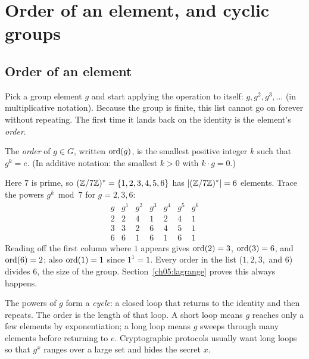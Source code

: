 \section{Order of an element, and cyclic groups}
\label{ch05:order}

\subsection{Order of an element}

Pick a group element $g$ and start applying the operation to itself: $g, g^2, g^3,
\dots$ (in multiplicative notation). Because the group is finite, this list cannot go on
forever without repeating. The first time it lands back on the identity is the element's
\emph{order}.

\begin{definition}
\label{ch05:def-order}
The \emph{order} of $g \in G$, written $\operatorname{ord}(g)$, is the smallest positive integer $k$
such that $g^k = e$. (In additive notation: the smallest $k>0$ with $k\cdot g = 0$.)
\end{definition}

\begin{example}
\label{ch05:ex-orders-7}
Here $7$ is prime, so $(\mathbb{Z}/7\mathbb{Z})^{*} = \{1,2,3,4,5,6\}$ has $\lvert(\mathbb{Z}/7\mathbb{Z})^{*}\rvert = 6$ elements. Trace the powers $g^k \bmod 7$ for $g = 2, 3, 6$:
\[
\begin{array}{l|cccccc}
g & g^1 & g^2 & g^3 & g^4 & g^5 & g^6 \\\hline
2 & 2 & 4 & 1 & 2 & 4 & 1 \\
3 & 3 & 2 & 6 & 4 & 5 & 1 \\
6 & 6 & 1 & 6 & 1 & 6 & 1
\end{array}
\]
Reading off the first column where $1$ appears gives $\operatorname{ord}(2)=3$, $\operatorname{ord}(3)=6$, and $\operatorname{ord}(6)=2$; also
$\operatorname{ord}(1)=1$ since $1^1 = 1$. Every order in the list ($1, 2, 3,$ and $6$) divides $6$, the size
of the group. Section~\ref{ch05:lagrange} proves this always happens.
\end{example}

\begin{intuitionbox}
The powers of $g$ form a \emph{cycle}: a closed loop that returns to the identity and then
repeats. The order is the length of that loop. A short loop means $g$ reaches only a few elements
by exponentiation; a long loop means $g$ sweeps through many elements before returning to $e$.
Cryptographic protocols usually want long loops so that $g^x$ ranges over a large set and hides the secret $x$.
\end{intuitionbox}

